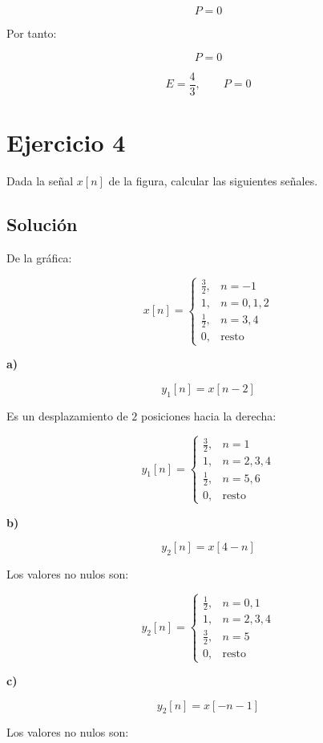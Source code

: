 \documentclass[fleqn]{article}
\begin{document}
	\[
	P=0
	\]

	Por tanto:

	\[
	\boxed{
	P=0
	}
	\]

	\[
	\boxed{
	E=\frac{4}{3},
	\qquad
	P=0
	}
	\]

\section{Ejercicio 4}
	Dada la señal $x[n]$ de la figura, calcular las siguientes señales.

	\subsection{Solución}

	De la gráfica:

	\[
	x[n]=
	\begin{cases}
	\frac{3}{2}, & n=-1 \\[1mm]
	1, & n=0,1,2 \\[1mm]
	\frac{1}{2}, & n=3,4 \\[1mm]
	0, & \text{resto}
	\end{cases}
	\]

	\textbf{a)}

	\[
	y_1[n]=x[n-2]
	\]

	Es un desplazamiento de $2$ posiciones hacia la derecha:

	\[
	\boxed{
	y_1[n]=
	\begin{cases}
	\frac{3}{2}, & n=1 \\[1mm]
	1, & n=2,3,4 \\[1mm]
	\frac{1}{2}, & n=5,6 \\[1mm]
	0, & \text{resto}
	\end{cases}
	}
	\]

	\textbf{b)}

	\[
	y_2[n]=x[4-n]
	\]

	Los valores no nulos son:

	\[
	\boxed{
	y_2[n]=
	\begin{cases}
	\frac{1}{2}, & n=0,1 \\[1mm]
	1, & n=2,3,4 \\[1mm]
	\frac{3}{2}, & n=5 \\[1mm]
	0, & \text{resto}
	\end{cases}
	}
	\]

	\textbf{c)}

	\[
	y_2[n]=x[-n-1]
	\]

	Los valores no nulos son:
\end{document}

